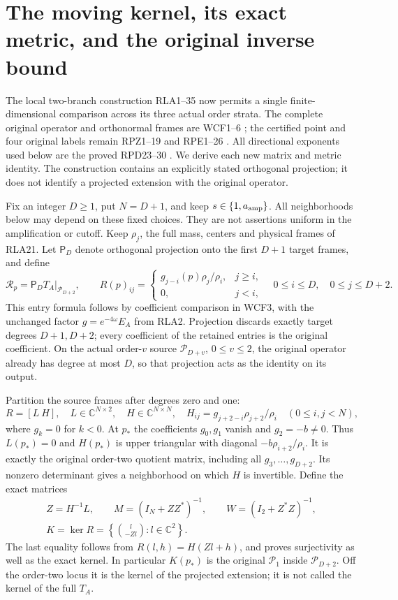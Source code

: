 \section{The moving kernel, its exact metric, and the original inverse bound}
\label{sec:real-pair-moving-quotient}
The local two-branch construction RLA1--35 now permits a single
finite-dimensional comparison across its three actual order strata.
The complete original operator and orthonormal frames are WCF1--6
\cite{WCF}; the certified point and four original labels remain
RPZ1--19 and RPE1--26 \cite{RPZ005,RPE005}.  All directional
exponents used below are the proved RPD23--30 \cite{RPD006}.
We derive each new matrix and metric identity.  The construction
contains an explicitly stated orthogonal projection; it does not
identify a projected extension with the original operator.

Fix an integer $D\ge1$, put $N=D+1$, and keep $s\in\{1,a_{\rm amp}\}$.
All neighborhoods below may depend on these fixed choices.  They are
not assertions uniform in the amplification or cutoff.
Keep $\rho_j$, the full mass, centers and physical frames of RLA21.
Let $\mathsf P_D$ denote orthogonal projection onto the first $D+1$
target frames, and define
\[
 \mathscr R_p=\mathsf P_D T_A|_{\mathcal P_{D+2}},\qquad
 R(p)_{ij}=\begin{cases}g_{j-i}(p)\rho_j/\rho_i,&j\ge i,\\
 0,&j<i,\end{cases}
 \quad 0\le i\le D,\quad0\le j\le D+2.
 \tag{RQT1}
\]
This entry formula follows by coefficient comparison in WCF3,
with the unchanged factor $g=e^{-4\omega}E_A$ from RLA2.
Projection discards exactly target degrees $D+1,D+2$; every
coefficient of the retained entries is the original coefficient.
On the actual order-$v$ source $\mathcal P_{D+v}$, $0\le v\le2$,
the original operator already has degree at most $D$, so that
projection acts as the identity on its output.

Partition the source frames after degrees zero and one:
\[
 R=[L\ H],\quad L\in\mathbb C^{N\times2},\quad
 H\in\mathbb C^{N\times N},\quad
 H_{ij}=g_{j+2-i}\rho_{j+2}/\rho_i\quad(0\le i,j<N),
 \tag{RQT2}
\]
where $g_k=0$ for $k<0$.  At $p_*$ the coefficients $g_0,g_1$
vanish and $g_2=-b\ne0$.  Thus $L(p_*)=0$ and $H(p_*)$ is
upper triangular with diagonal $-b\rho_{i+2}/\rho_i$.
It is exactly the original order-two quotient matrix, including
all $g_3,\ldots,g_{D+2}$.  Its nonzero determinant gives a
neighborhood on which $H$ is invertible.  Define the exact matrices
\[
 \begin{gathered}Z=H^{-1}L,\qquad M=(I_N+ZZ^*)^{-1},\qquad
 W=(I_2+Z^*Z)^{-1},\\
 K=\ker R=\left\{\binom{l}{-Zl}:l\in\mathbb C^2\right\}.
 \end{gathered}\tag{RQT3}
\]
The last equality follows from $R(l,h)=H(Zl+h)$, and proves
surjectivity as well as the exact kernel.  In particular $K(p_*)$
is the original $\mathcal P_1$ inside $\mathcal P_{D+2}$.
Off the order-two locus it is the kernel of the projected extension;
it is not called the kernel of the full $T_A$.

